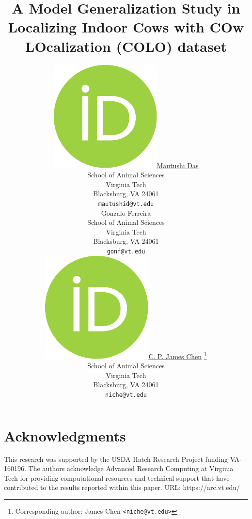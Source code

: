 \documentclass{article}
\title{A Model Generalization Study in Localizing Indoor Cows with COw LOcalization (COLO) dataset}
\author{
    \href{https://orcid.org/0009-0001-8932-142X}{\includegraphics[scale=0.06]{orcid.pdf}\hspace{1mm}Mautushi Das} \\
	School of Animal Sciences\\
	Virginia Tech\\
	Blacksburg, VA 24061 \\
	\texttt{mautushid@vt.edu} \\
	\And
    Gonzalo Ferreira \\
	School of Animal Sciences\\
	Virginia Tech\\
	Blacksburg, VA 24061 \\
	\texttt{gonf@vt.edu} \\
	\And
	\href{https://orcid.org/0000-0002-2018-0702}{\includegraphics[scale=0.06]{orcid.pdf}\hspace{1mm}C. P. James Chen} \thanks{Corresponding author: James Chen \texttt{<niche@vt.edu>}}\\
	School of Animal Sciences\\
	Virginia Tech\\
	Blacksburg, VA 24061 \\
	\texttt{niche@vt.edu}
}
\begin{document}
\maketitle


\newpage




\section*{Acknowledgments}

This research was supported by the USDA Hatch Research Project funding VA-160196. The authors acknowledge Advanced Research Computing at Virginia Tech for providing computational resources and technical support that have contributed to the results reported within this paper. URL: https://arc.vt.edu/

\newpage




\newpage


\end{document}
